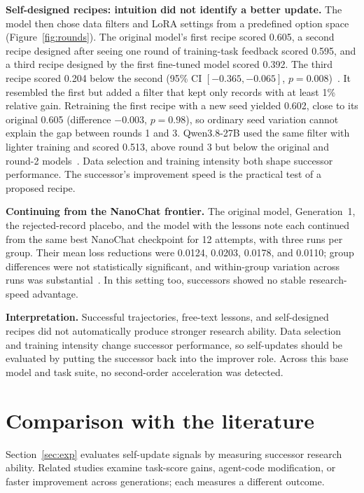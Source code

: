 \documentclass{article}
\begin{document}
\textbf{Self-designed recipes: intuition did not identify a better update.} The model then chose data filters and LoRA settings from a predefined option space (Figure~\ref{fig:rounds}). The original model's first recipe scored 0.605, a second recipe designed after seeing one round of training-task feedback scored 0.595, and a third recipe designed by the first fine-tuned model scored 0.392. The third recipe scored 0.204 below the second (95\% CI $[-0.365, -0.065]$, $p=0.008$)~\cite{LOG-E,decisions-decisions-1235-json}. It resembled the first but added a filter that kept only records with at least 1\% relative gain. Retraining the first recipe with a new seed yielded 0.602, close to its original 0.605 (difference $-0.003$, $p=0.98$), so ordinary seed variation cannot explain the gap between rounds 1 and 3. Qwen3.8-27B used the same filter with lighter training and scored 0.513, above round 3 but below the original and round-2 models~\cite{LOG-E,decisions-decisions-1420-json}. Data selection and training intensity both shape successor performance. The successor’s improvement speed is the practical test of a proposed recipe.

\textbf{Continuing from the NanoChat frontier.} The original model, Generation~1, the rejected-record placebo, and the model with the lessons note each continued from the same best NanoChat checkpoint for 12 attempts, with three runs per group. Their mean loss reductions were 0.0124, 0.0203, 0.0178, and 0.0110; group differences were not statistically significant, and within-group variation across runs was substantial~\cite{decisions-cf-analysis-json}. In this setting too, successors showed no stable research-speed advantage.

\textbf{Interpretation.} Successful trajectories, free-text lessons, and self-designed recipes did not automatically produce stronger research ability. Data selection and training intensity change successor performance, so self-updates should be evaluated by putting the successor back into the improver role. Across this base model and task suite, no second-order acceleration was detected.

\section{Comparison with the literature}
\label{sec:lit}

Section~\ref{sec:exp} evaluates self-update signals by measuring successor research ability. Related studies examine task-score gains, agent-code modification, or faster improvement across generations; each measures a different outcome.
\end{document}
